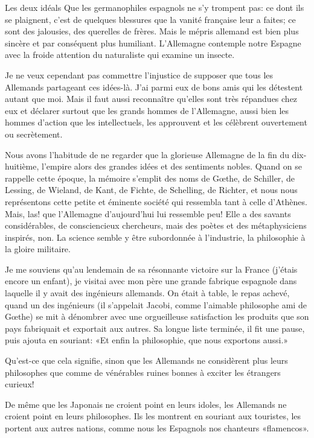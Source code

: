\begin{chapter}{Les deux idéals}
Que les germanophiles espagnols ne s'y trompent pas: ce dont ils se
plaignent, c'est de quelques blessures que la vanité française leur a
faites; ce sont des jalousies, des querelles de frères. Mais le mépris
allemand est bien plus sincère et par conséquent plus humiliant.
L'Allemagne contemple notre Espagne avec la froide attention du
naturaliste qui examine un insecte.

Je ne veux cependant pas commettre l'injustice de supposer que tous les
Allemands partageant ces idées-là. J'ai parmi eux de bons amis qui les
détestent autant que moi. Mais il faut aussi reconnaître qu'elles sont
très répandues chez eux et déclarer surtout que les grands hommes de
l'Allemagne, aussi bien les hommes d'action que les intellectuels, les
approuvent et les célèbrent ouvertement ou secrètement.

Nous avons l'habitude de ne regarder que la glorieuse Allemagne de la
fin du dix-huitième, l'empire alors des grandes idées et des sentiments
nobles. Quand on se rappelle cette époque, la mémoire s'emplit des noms
de Gœthe, de Schiller, de Lessing, de Wieland, de Kant, de Fichte, de
Schelling, de Richter, et nous nous représentons cette petite et
éminente société qui ressembla tant à celle d'Athènes. Mais, las! que
l'Allemagne d'aujourd'hui lui ressemble peu! Elle a des savants
considérables, de consciencieux chercheurs, mais des poètes et des
métaphysiciens inspirés, non. La science semble y être subordonnée à
l'industrie, la philosophie à la gloire militaire.

Je me souviens qu'au lendemain de sa résonnante victoire sur la France
(j'étais encore un enfant), je visitai avec mon père une grande fabrique
espagnole dans laquelle il y avait des ingénieurs allemands. On était à
table, le repas achevé, quand un des ingénieurs (il s'appelait Jacobi,
comme l'aimable philosophe ami de Gœthe) se mit à dénombrer avec une
orgueilleuse satisfaction les produits que son pays fabriquait et
exportait aux autres. Sa longue liste terminée, il fit une pause, puis
ajouta en souriant: «Et enfin la philosophie, que nous exportons aussi.»

Qu'est-ce que cela signifie, sinon que les Allemands ne considèrent plus
leurs philosophes que comme de vénérables ruines bonnes à exciter les
étrangers curieux!

De même que les Japonais ne croient point en leurs idoles, les Allemands
ne croient point en leurs philosophes. Ils les montrent en souriant aux
touristes, les portent aux autres nations, comme nous les Espagnols nos
chanteurs «flamencos».


\end{chapter}
